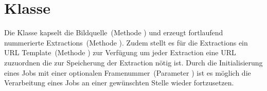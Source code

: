 \section{Klasse }
Die Klasse  kapselt die Bildquelle~(Methode ) und erzeugt fortlaufend nummerierte Extractions~(Methode ).
Zudem stellt es für die Extractions ein URL Template~(Methode ) zur Verfügung um jeder Extraction eine URL zuzuordnen die zur Speicherung der Extraction nötig ist.
Durch die Initialisierung eines Jobs mit einer optionalen Framenummer~(Parameter ) ist es möglich die Verarbeitung eines Jobs an einer gewünschten Stelle wieder fortzusetzen.


